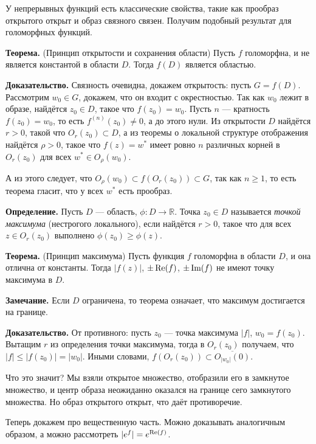 \QED

У непрерывных функций есть классические свойства, такие как прообраз открытого открыт и образ связного связен.
Получим подобный результат для голоморфных функций.

\textbf{Теорема.} (Принцип открытости и сохранения области)
Пусть $f$ голоморфна, и не является константой в области $D$.
Тогда $f(D)$ является областью.

\textbf{Доказательство.} Связность очевидна, докажем открытость: пусть $G = f(D)$.
Рассмотрим $w_0 \in G$, докажем, что он входит с окрестностью.
Так как $w_0$ лежит в образе, найдётся $z_0 \in D$, такое что $f(z_0) = w_0$.
Пусть $n$ --- кратность $f(z_0) = w_0$, то есть $f^{(n)}(z_0) \ne 0$, а до этого нули.
Из открытости $D$ найдётся $r > 0$, такой что $O_r(z_0) \subset D$, а из теоремы о локальной структуре отображения найдётся $\rho > 0$, такое что $f(z) = w^*$ имеет ровно $n$ различных корней в $O_r(z_0)$ для всех $w^* \in O_\rho(w_0)$.

А из этого следует, что $O_\rho(w_0) \subset f(O_r(z_0)) \subset G$, так как $n \ge 1$, то есть теорема гласит, что у всех $w^*$ есть прообраз.

\QED

\textbf{Определение.} Пусть $D$ --- область, $\phi: D \to \mathbb R$.
Точка $z_0 \in D$ называется \textit{точкой максимума} (нестрогого локального), если найдётся $r > 0$, такое что для всех $z \in O_r(z_0)$ выполнено $\phi(z_0) \ge \phi(z)$.

\textbf{Теорема.} (Принцип максимума) Пусть функция $f$ голоморфна в области $D$, и она отлична от константы.
Тогда $|f(z)|$, $\pm \operatorname{Re}(f)$, $\pm \operatorname{Im}(f)$ не имеют точку максимума в $D$.

\textbf{Замечание.} Если $D$ ограничена, то теорема означает, что максимум достигается на границе.

\textbf{Доказательство.} От противного: пусть $z_0$ --- точка максимума $|f|$, $w_0 = f(z_0)$.
Вытащим $r$ из определения точки максимума, тогда в $O_r(z_0)$ получаем, что $|f| \le |f(z_0)| = |w_0|$.
Иными словами, $f(O_r(z_0)) \subset \overline{O_{|w_0|}(0)}$.

Что это значит? Мы взяли открытое множество, отобразили его в замкнутое множество, и центр образа неожиданно оказался на границе сего замкнутого множества.
Но образ открытого открыт, что даёт противоречие.

Теперь докажем про вещественную часть.
Можно доказывать аналогичным образом, а можно рассмотреть $|e^f| = e^{\operatorname{Re}(f)}$.

